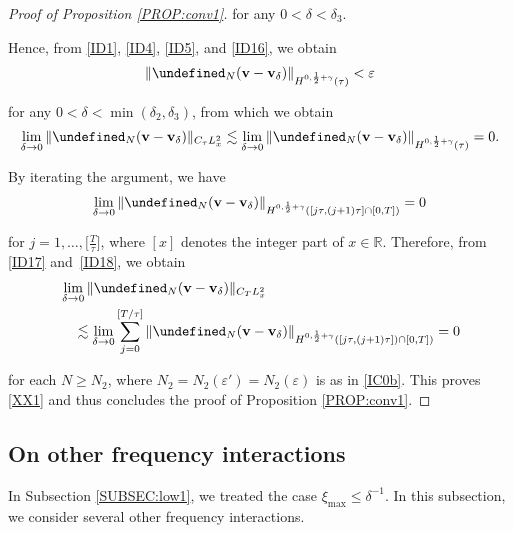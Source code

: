 \documentclass[letterpaper, 11pt,  reqno]{amsart}
\newcommand{\1}{\hspace{0.5mm}\textup{I}\hspace{0.5mm}}
\newcommand{\noi}{\noindent}
\newcommand{\R}{\mathbb{R}}
\let\P= \undefined
\newcommand{\P}{\mathbf{P}}
\newcommand{\dl}{\delta}
\newcommand{\eps}{\varepsilon}
\newcommand{\g}{\gamma}
\newcommand{\les}{\lesssim}
\newcommand{\vv}{\mathbf{v}}
\numberwithin{equation}{section}
\numberwithin{theorem}{section}
\begin{document}
\begin{proof}[Proof of Proposition \ref{PROP:conv1}]
\noi
for any $0 < \dl < \dl_3$.


Hence, from \eqref{ID1}, \eqref{ID4}, \eqref{ID5}, and \eqref{ID16}, 
we obtain
\begin{align*}
\|\P_N (\vv - \vv_\dl) \|_{H^{0, \frac 12 + \g}(\tau)}
< \eps
\end{align*}


\noi
for any $0 < \dl < \min(\dl_2, \dl_3)$, 
from which we obtain
\begin{align}
\lim_{\dl \to 0 }
\|\P_N (\vv - \vv_\dl) \|_{C_\tau L^2_x}
\les 
\lim_{\dl \to 0 }
\|\P_N (\vv - \vv_\dl) \|_{H^{0, \frac 12 + \g}(\tau) }=0.
\label{ID17}
\end{align}

\noi
By iterating the  argument, 
we have
\begin{align}
\lim_{\dl \to 0 }
\|\P_N (\vv - \vv_\dl) \|_{H^{0, \frac 12 + \g}([j \tau, (j+1)\tau] \cap [0, T]) }=0
\label{ID18}
\end{align}


\noi
for $j = 1, \dots, \big[\frac {T}\tau \big]$, 
where $[x]$ denotes the integer part of $x \in \R$.
Therefore, from \eqref{ID17} and~\eqref{ID18}, we obtain
\begin{align*}
& \lim_{\dl \to 0 }
 \|\P_N (\vv - \vv_\dl) \|_{C_{T} L^2_x}\\
& \quad \les 
\lim_{\dl \to 0 }
\sum_{j = 0}^{[T/\tau]}
\|\P_N (\vv - \vv_\dl) \|_{H^{0, \frac 12 + \g}([j \tau, (j+1)\tau]) \cap [0, T]) }=0
\end{align*}

\noi
for each $N \ge N_2$, where $N_2 = N_2(\eps') = N_2(\eps)$ is as in 
\eqref{IC0b}.
This proves \eqref{XX1}
and thus 
 concludes the proof of Proposition \ref{PROP:conv1}.
\end{proof}













\subsection{On other frequency interactions}
\label{SUBSEC:low2}

In Subsection \ref{SUBSEC:low1},  we treated the case $\xi_{\max} \le \dl^{-1}$.
In this subsection, we consider several other frequency interactions.
\end{document}
